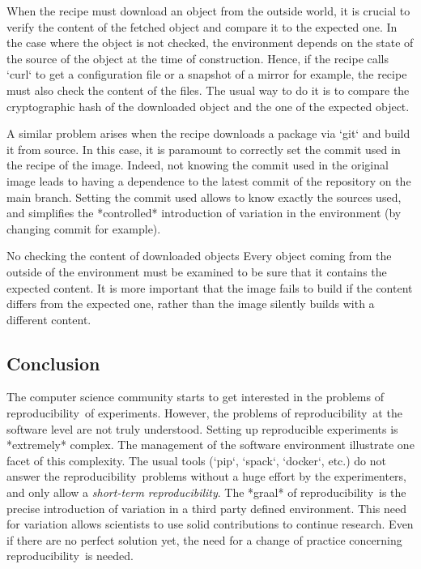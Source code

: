 \documentclass[sigconf,natbib=false]{acmart}
\newcommand{\repro}{reproducibility}
\begin{document}
When the recipe must download an object from the outside world, it is crucial to verify the content of the fetched object and compare it to the expected one.
In the case where the object is not checked, the environment depends on the state of the source of the object at the time of construction.
Hence, if the recipe calls `curl` to get a configuration file or a snapshot of a mirror for example, the recipe must also check the content of the files.
The usual way to do it is to compare the cryptographic hash of the downloaded object and the one of the expected object. 


A similar problem arises when the recipe downloads a package via `git` and build it from source.
In this case, it is paramount to correctly set the commit used in the recipe of the image.
Indeed, not knowing the commit used in the original image leads to having a dependence to the latest commit of the repository on the main branch.
Setting the commit used allows to know exactly the sources used, and simplifies the *controlled* introduction of variation in the environment (by changing commit for example). 

\begin{trap}{No checking the content of downloaded objects}{}
Every object coming from the outside of the environment must be examined to be sure that it contains the expected content. 
It is more important that the image fails to build if the content differs from the expected one, rather than the image silently builds with a different content.
\end{trap}

\subsection{Conclusion}

The computer science community starts to get interested in the problems of \repro\ of experiments.
However, the problems of \repro\ at the software level are not truly understood.
Setting up reproducible experiments is *extremely* complex.
The management of the software environment illustrate one facet of this complexity.
The usual tools (`pip`, `spack`, `docker`, etc.) do not answer the \repro\ problems without a huge effort by the experimenters, and only allow a \emph{short-term \repro}.
The *graal* of \repro\ is the precise introduction of variation in a third party defined environment.
This need for variation allows scientists to use solid contributions to continue research.
Even if there are no perfect solution yet, the need for a change of practice concerning \repro\ is needed.
\end{document}
